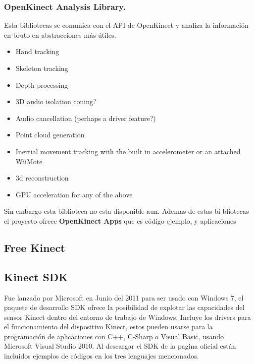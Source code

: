 \documentclass[11pt,a4paper]{article}
\begin{document}
\subsubsection{OpenKinect Analysis Library.}
Esta bibliotecas se comunica con el API de OpenKinect y analiza la información en bruto en abstracciones más útiles.
\begin{itemize}
\item Hand tracking
\item Skeleton tracking
\item Depth processing
\item 3D audio isolation coning?
\item Audio cancellation (perhaps a driver feature?)
\item Point cloud generation
\item Inertial movement tracking with the built in accelerometer or an attached WiiMote
\item 3d reconstruction
\item GPU acceleration for any of the above 
\end{itemize}
Sin embargo esta biblioteca no esta disponible aun. Ademas de estas bi-bliotecas el proyecto ofrece \textbf{OpenKinect Apps} que es  código ejemplo, y aplicaciones 

\subsection{Free Kinect}

\subsection{Kinect SDK}
Fue lanzado por Microsoft en Junio del 2011 para ser usado con Windows 7, el paquete de desarrollo SDK ofrece la posibilidad de explotar las capacidades del sensor Kinect dentro del entorno de trabajo de Windows. Incluye los drivers para el funcionamiento del dispositivo Kinect, estos pueden usarse para la programación de aplicaciones con C++, C-Sharp o Visual Basic, usando Microsoft Visual Studio 2010. Al descargar el SDK de la pagina oficial están incluidos ejemplos de códigos en los tres lenguajes mencionados.
\end{document}
